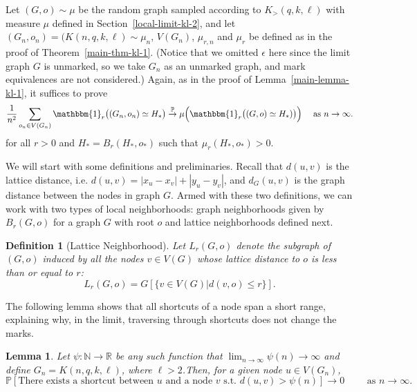 \documentclass[10pt]{amsart}
\newtheorem{lemma}[theorem]{Lemma}
\newtheorem{definition}[theorem]{Definition}
\begin{document}
Let $(G, o) \sim \mu$ be the random graph sampled according to $K_>(q, k, \ell)$  with measure $\mu$ defined in Section~\ref{local-limit-kl-2}, and let $(G_n, o_n) = (K(n, q, k, \ell) \sim \mu_n$, $V(G_n)$, $\mu_{r,n}$ and $\mu_r$ be defined as in the proof of Theorem~\ref{main-thm-kl-1}. (Notice that we omitted $\epsilon$ here since the limit graph $G$ is unmarked, so we take $G_n$ as an unmarked graph, and mark equivalences are not considered.) Again, as in the proof of Lemma~\ref{main-lemma-kl-1}, it suffices to prove 
\begin{equation} \label{main-lemma-kl-2} 
\frac{1}{n^2}\sum_{o_n\in V(G_n)}  \mathbbm{1}_r\big((G_n,o_n)\simeq H_* \big)\overset{\mathbb P}{\to}\mu\Big(  \mathbbm{1}_r\big((G,o)\simeq H_*)\big)\Big) \quad \text{ as $n \to \infty.$}
\end{equation}
for all $r > 0$ and $H_* = B_r(H_*, o_*)$ such that $\mu_r(H_*, o_*)>0$.

We will start with some definitions and preliminaries. 
Recall that $d(u, v)$ is the lattice distance, i.e. $d(u, v) = |x_u - x_v| + |y_u - y_v|$, and $d_G(u, v)$ is the graph distance between the nodes in graph $G$.
Armed with these two definitions, we can work with two types of local neighborhoods: graph neighborhoods given by $B_r(G, o)$ for a graph $G$ with root $o$ and lattice neighborhoods defined next.

\begin{definition} [Lattice Neighborhood] Let $L_r(G, o)$ denote the subgraph of $(G, o)$ induced by all the nodes $v \in V(G)$ whose lattice distance to $o$ is less than or equal to $r$: $$L_r(G, o) = G[\{v \in V(G) | d(v, o) \leq r\}].$$
\end{definition}

The following lemma shows that all shortcuts of a node span a short range, explaining why, in the limit, traversing through shortcuts does not change the marks.

\begin{lemma} \label{incoming shortcut} Let $\psi:\mathbb{N}\to\mathbb R$ be any such function that $\lim_{n \to \infty} \psi(n) \to \infty$ and define  $G_n = K(n, q, k, \ell)$, where $\ell>2$.Then, for a given node $u \in V(G_n)$,
$$\mathbb{P}[\text{There exists a shortcut between $u$ and a node $v$ s.t. } d(u, v) > \psi(n)] \to 0\qquad \text{ as }n \to \infty.$$
\end{lemma} 
\end{document}
